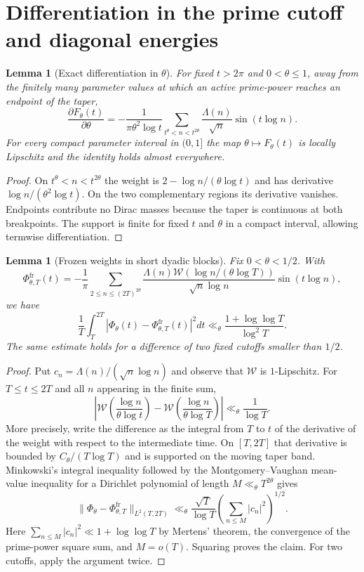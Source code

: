 \documentclass[11pt,leqno]{amsart}
\numberwithin{equation}{section}
\newtheorem{lemma}[theorem]{Lemma}
\theoremstyle{definition}
\theoremstyle{remark}
\newcommand{\1}{\mathbf 1}
\newcommand{\tW}{\mathscr W}
\begin{document}
\section{Differentiation in the prime cutoff and diagonal energies}\label{sec:theta}
\begin{lemma}[Exact differentiation in $\theta$]\label{lem:theta-deriv}
For fixed $t>2\pi$ and $0<\theta\le1$, away from the finitely many parameter values at which an active prime-power reaches an endpoint of the taper,
\begin{equation}\label{eq:theta-derivative}
 \boxed{\frac{\partial F_\theta(t)}{\partial\theta}
 =-\frac1{\pi\theta^2\log t}\sum_{t^\theta<n<t^{2\theta}}
 \frac{\Lambda(n)}{\sqrt n}\sin(t\log n).}
\end{equation}
For every compact parameter interval in $(0,1]$ the map $\theta\mapsto F_\theta(t)$ is locally Lipschitz and the identity holds almost everywhere.
\end{lemma}
\begin{proof}
On $t^\theta<n<t^{2\theta}$ the weight is $2-\log n/(\theta\log t)$ and has derivative $\log n/(\theta^2\log t)$. On the two complementary regions its derivative vanishes. Endpoints contribute no Dirac masses because the taper is continuous at both breakpoints. The support is finite for fixed $t$ and $\theta$ in a compact interval, allowing termwise differentiation.
\end{proof}
\begin{lemma}[Frozen weights in short dyadic blocks]\label{lem:freeze}
Fix $0<\theta<1/2$. With
\begin{equation}\label{eq:frozen}
 \Phi_{\theta,T}^{\mathrm{fr}}(t)=
 -\frac1\pi\sum_{2\le n\le(2T)^{2\theta}}
 \frac{\Lambda(n)\tW(\log n/(\theta\log T))}{\sqrt n\log n}\sin(t\log n),
\end{equation}
we have
\begin{equation}\label{eq:freeze-bound}
 \frac1T\int_T^{2T}|\Phi_\theta(t)-\Phi_{\theta,T}^{\mathrm{fr}}(t)|^2dt
 \ll_\theta\frac{1+\log\log T}{\log^2T}.
\end{equation}
The same estimate holds for a difference of two fixed cutoffs smaller than $1/2$.
\end{lemma}
\begin{proof}
Put $c_n=\Lambda(n)/(\sqrt n\log n)$ and observe that $\tW$ is $1$-Lipschitz. For $T\le t\le2T$ and all $n$ appearing in the finite sum,
\[
 \left|\tW\left(\frac{\log n}{\theta\log t}\right)
 -\tW\left(\frac{\log n}{\theta\log T}\right)\right|\ll_\theta\frac1{\log T}.
\]
More precisely, write the difference as the integral from $T$ to $t$ of the derivative of the weight with respect to the intermediate time. On $[T,2T]$ that derivative is bounded by $C_\theta/(T\log T)$ and is supported on the moving taper band. Minkowski's integral inequality followed by the Montgomery--Vaughan mean-value inequality for a Dirichlet polynomial of length $M\ll_\theta T^{2\theta}$ gives
\[
 \|\Phi_\theta-\Phi_{\theta,T}^{\mathrm{fr}}\|_{L^2(T,2T)}
 \ll_\theta\frac{\sqrt T}{\log T}
 \left(\sum_{n\le M}|c_n|^2\right)^{1/2}.
\]
Here $\sum_{n\le M}|c_n|^2\ll 1+\log\log T$ by Mertens' theorem, the convergence of the prime-power square sum, and $M=o(T)$. Squaring proves the claim. For two cutoffs, apply the argument twice.
\end{proof}
\end{document}

